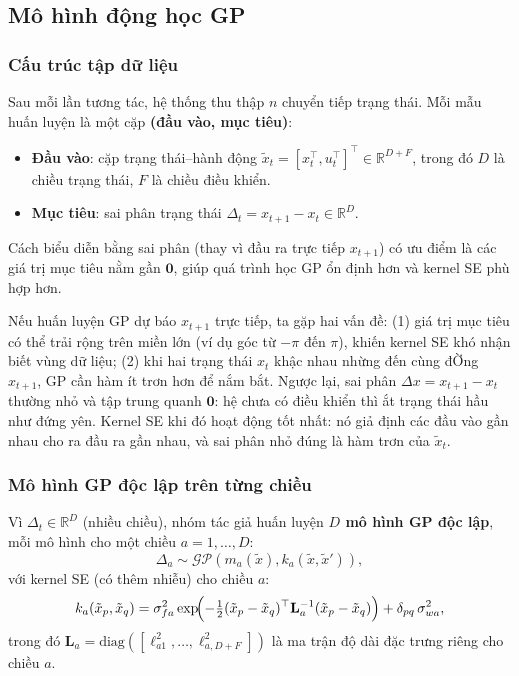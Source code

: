 \subsection{Mô hình động học GP}
\label{SUB_SEC_gp_model}

\subsubsection{Cấu trúc tập dữ liệu}
\label{SUB_SUB_SEC_dataset}

Sau mỗi lần tương tác, hệ thống thu thập $n$ chuyển tiếp trạng thái. Mỗi mẫu huấn luyện là một cặp \textbf{(đầu vào, mục tiêu)}:
\begin{itemize}
    \item \textbf{Đầu vào}: cặp trạng thái--hành động $\tilde{x}_t = [x_t^\top, u_t^\top]^\top \in \mathbb{R}^{D+F}$, trong đó $D$ là chiều trạng thái, $F$ là chiều điều khiển.
    \item \textbf{Mục tiêu}: sai phân trạng thái $\Delta_t = x_{t+1} - x_t \in \mathbb{R}^D$.
\end{itemize}

Cách biểu diễn bằng sai phân (thay vì đầu ra trực tiếp $x_{t+1}$) có ưu điểm là các giá trị mục tiêu nằm gần $\mathbf{0}$, giúp quá trình học GP ổn định hơn và kernel SE phù hợp hơn.

\begin{nx}
\label{NX_delta_x_intuition}
Nếu huấn luyện GP dự báo $x_{t+1}$ trực tiếp, ta gặp hai vấn đề: (1) giá trị mục tiêu có thể trải rộng trên miền lớn (ví dụ góc từ $-\pi$ đến $\pi$), khiến kernel SE khó nhận biết vùng dữ liệu; (2) khi hai trạng thái $x_t$ khậc nhau nhừng đến cùng đỜng $x_{t+1}$, GP cần hàm ít trơn hơn để nắm bắt. Ngược lại, sai phân $\Delta x = x_{t+1} - x_t$ thường nhỏ và tập trung quanh $\mathbf{0}$: hệ chưa có điều khiển thì ắt trạng thái hầu như đứng yên. Kernel SE khi đó hoạt động tốt nhất: nó giả định các đầu vào gần nhau cho ra đầu ra gần nhau, và sai phân nhỏ đúng là hàm trơn của $\tilde{x}_t$.
\end{nx}

\subsubsection{Mô hình GP độc lập trên từng chiều}
\label{SUB_SUB_SEC_gp_independent}

Vì $\Delta_t \in \mathbb{R}^D$ (nhiều chiều), nhóm tác giả huấn luyện \textbf{$D$ mô hình GP độc lập}, mỗi mô hình cho một chiều $a = 1, \dots, D$:
\begin{equation}
    \Delta_a \sim \mathcal{GP}(m_a(\tilde{x}), k_a(\tilde{x}, \tilde{x}')),
    \label{gp_tung_chieu}
\end{equation}
với kernel SE (có thêm nhiễu) cho chiều $a$:
\begin{equation}
    k_a(\tilde{x}_p, \tilde{x}_q) = \sigma_{fa}^2 \exp\!\Bigl(-\tfrac{1}{2}(\tilde{x}_p - \tilde{x}_q)^\top \mathbf{L}_a^{-1} (\tilde{x}_p - \tilde{x}_q)\Bigr) + \delta_{pq}\,\sigma_{wa}^2,
    \label{kernel_chieu_a}
\end{equation}
trong đó $\mathbf{L}_a = \mathrm{diag}([\ell_{a1}^2, \dots, \ell_{a,D+F}^2])$ là ma trận độ dài đặc trưng riêng cho chiều $a$.

